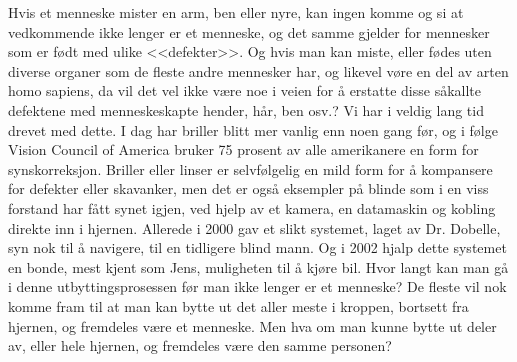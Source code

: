Hvis et menneske mister en arm, ben eller nyre, kan ingen komme og si at vedkommende ikke lenger er et menneske, og det samme gjelder for mennesker som er født med ulike <<defekter>>. Og hvis man kan miste, eller fødes uten diverse organer som de fleste andre mennesker har, og likevel vøre en del av arten homo sapiens, da vil det vel ikke være noe i veien for å erstatte disse såkallte defektene med menneskeskapte hender, hår, ben osv.? Vi har i veldig lang tid drevet med dette. I dag har briller blitt mer vanlig enn noen gang før, og i følge Vision Council of America bruker 75 prosent av alle amerikanere en form for synskorreksjon. Briller eller linser er selvfølgelig en mild form for å kompansere for defekter eller skavanker, men det er også eksempler på blinde som i en viss forstand har fått synet igjen, ved hjelp av et kamera, en datamaskin og kobling direkte inn i hjernen. Allerede i 2000 gav et slikt systemet, laget av Dr. Dobelle, syn nok til å navigere, til en tidligere blind mann. Og i 2002 hjalp dette systemet en bonde, mest kjent som Jens, muligheten til å kjøre bil.
Hvor langt kan man gå i denne utbyttingsprosessen før man ikke lenger er et menneske?
De fleste vil nok komme fram til at man kan bytte ut det aller meste i kroppen, bortsett fra hjernen, og fremdeles være et menneske. Men hva om man kunne bytte ut deler av, eller hele hjernen, og fremdeles være den samme personen? 
